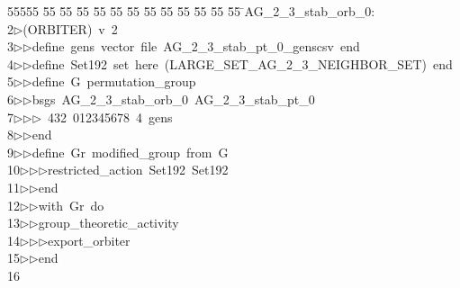 %
%
\begin{tabbing}
55555 \= 55 \= 55 \= 55 \= 55 \= 55 \= 55 \= 55 \= 55 \= 55 \= 55 \= 55 \= 55 \= \>AG\_2\_3\_stab\_orb\_0:\\[0pt]
2\>$\triangleright$\>(ORBITER)\ v\ 2\ \\[0pt]
3\>$\triangleright$\>$\triangleright$\>define\ gens\ vector\ file\ AG\_2\_3\_stab\_pt\_0\_genscsv\ end\ \\[0pt]
4\>$\triangleright$\>$\triangleright$\>define\ Set192\ set\ here\ (LARGE\_SET\_AG\_2\_3\_NEIGHBOR\_SET)\ end\ \\[0pt]
5\>$\triangleright$\>$\triangleright$\>define\ G\ permutation\_group\ \\[0pt]
6\>$\triangleright$\>$\triangleright$\>bsgs\ AG\_2\_3\_stab\_orb\_0\ AG\_2\_3\_stab\_pt\_0\ \\[0pt]
7\>$\triangleright$\>$\triangleright$\>$\triangleright$\ 432\ 012345678\ 4\ gens\ \\[0pt]
8\>$\triangleright$\>$\triangleright$\>end\ \\[0pt]
9\>$\triangleright$\>$\triangleright$\>define\ Gr\ modified\_group\ from\ G\ \\[0pt]
10\>$\triangleright$\>$\triangleright$\>$\triangleright$\>restricted\_action\ Set192\ Set192\ \\[0pt]
11\>$\triangleright$\>$\triangleright$\>end\ \\[0pt]
12\>$\triangleright$\>$\triangleright$\>with\ Gr\ do\ \\[0pt]
13\>$\triangleright$\>$\triangleright$\>group\_theoretic\_activity\ \\[0pt]
14\>$\triangleright$\>$\triangleright$\>$\triangleright$\>export\_orbiter\ \\[0pt]
15\>$\triangleright$\>$\triangleright$\>end\\[0pt]
16\>\end{tabbing}
